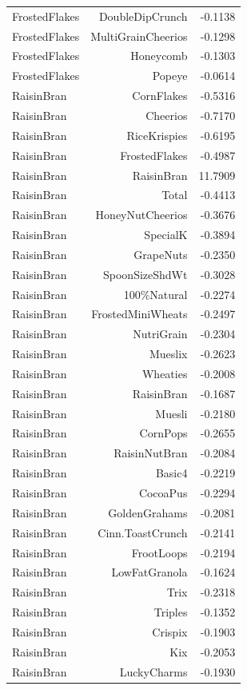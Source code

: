 \begin{longtable}{@{}lrr@{}}
FrostedFlakes & DoubleDipCrunch & -0.1138 \\
FrostedFlakes & MultiGrainCheerios & -0.1298 \\
FrostedFlakes & Honeycomb & -0.1303 \\
FrostedFlakes & Popeye & -0.0614 \\
RaisinBran & CornFlakes & -0.5316 \\
RaisinBran & Cheerios & -0.7170 \\
RaisinBran & RiceKrispies & -0.6195 \\
RaisinBran & FrostedFlakes & -0.4987 \\
RaisinBran & RaisinBran & 11.7909 \\
RaisinBran & Total & -0.4413 \\
RaisinBran & HoneyNutCheerios & -0.3676 \\
RaisinBran & SpecialK & -0.3894 \\
RaisinBran & GrapeNuts & -0.2350 \\
RaisinBran & SpoonSizeShdWt & -0.3028 \\
RaisinBran & 100\%Natural & -0.2274 \\
RaisinBran & FrostedMiniWheats & -0.2497 \\
RaisinBran & NutriGrain & -0.2304 \\
RaisinBran & Mueslix & -0.2623 \\
RaisinBran & Wheaties & -0.2008 \\
RaisinBran & RaisinBran & -0.1687 \\
RaisinBran & Muesli & -0.2180 \\
RaisinBran & CornPops & -0.2655 \\
RaisinBran & RaisinNutBran & -0.2084 \\
RaisinBran & Basic4 & -0.2219 \\
RaisinBran & CocoaPus & -0.2294 \\
RaisinBran & GoldenGrahams & -0.2081 \\
RaisinBran & Cinn.ToastCrunch & -0.2141 \\
RaisinBran & FrootLoops & -0.2194 \\
RaisinBran & LowFatGranola & -0.1624 \\
RaisinBran & Trix & -0.2318 \\
RaisinBran & Triples & -0.1352 \\
RaisinBran & Crispix & -0.1903 \\
RaisinBran & Kix & -0.2053 \\
RaisinBran & LuckyCharms & -0.1930 \\

\end{longtable}

